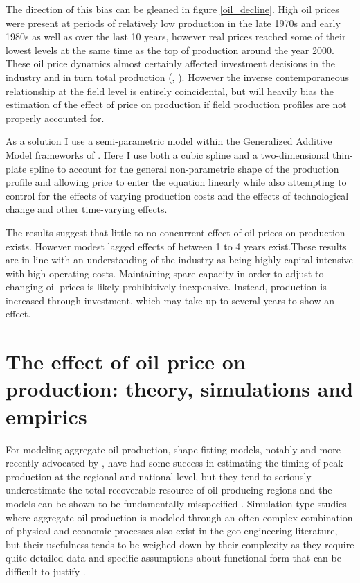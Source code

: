 \documentclass[11pt]{article}
\begin{document}
The direction of this bias can be gleaned in figure \ref{oil_decline}.  High oil prices were present at periods of relatively low production in the late 1970s and early 1980s as well as over the last 10 years, however real prices reached some of their lowest levels at the same time as the top of production around the year 2000. These oil price dynamics almost certainly affected investment decisions in the industry and in turn total production (\citep{osmundsen_is_2007}, \citep{aune_financial_2010}). However the inverse contemporaneous relationship at the field level is entirely coincidental, but will heavily bias the estimation of the effect of price on production if field production profiles are not properly accounted for. 



As a solution I use a semi-parametric model within the Generalized Additive Model frameworks of \cite{hastie_generalized_1990}.  Here I use both a cubic spline and a two-dimensional thin-plate spline to account for the general non-parametric shape of the production profile and allowing price to enter the equation linearly while also attempting to control for the effects of varying production costs and the effects of technological change and other time-varying effects.  

The results suggest that little to no concurrent effect of oil prices on production exists.  However modest lagged effects of between 1 to 4 years exist.These results are in line with an understanding of the industry as being highly capital intensive with high operating costs.  Maintaining spare capacity in order to adjust to changing oil prices is likely prohibitively inexpensive.  Instead, production is increased through investment, which may take up to several years to show an effect.

\FloatBarrier
\section{The effect of oil price on production: theory, simulations and empirics}

For modeling aggregate oil production, shape-fitting models, notably \citet{hubbert_energy_1962} and more recently advocated by \citet{deffeyes_hubberts_2001}, have had some success in estimating the timing of peak production at the regional and national level, but they tend to seriously underestimate the total recoverable resource of oil-producing regions and the models can be shown to be fundamentally misspecified \citep{boyce_prediction_2013}.   Simulation type studies where aggregate oil production is modeled through an often complex combination of physical and economic processes also exist in the geo-engineering literature, but their usefulness tends to be weighed down by their complexity as they require quite detailed data and specific assumptions about functional form that can be difficult to justify \citep{brandt_review_2010}.
\end{document}
